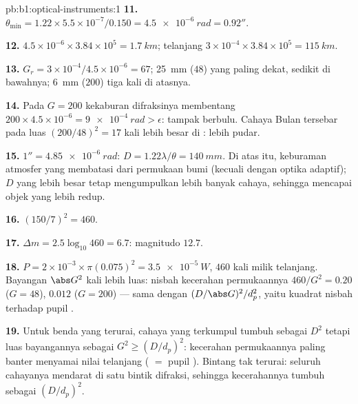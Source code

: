 \begin{solution}{pb:b1:optical-instruments:1}
\textbf{11.} $\theta_{\min} = 1.22 \times 5.5\times10^{-7}/0.150 =
\qty{4.5e-6}{rad} = 0.92''$.

\textbf{12.} $4.5\times10^{-6} \times 3.84\times10^5 = \qty{1.7}{km}$;
 telanjang $3\times10^{-4} \times 3.84\times10^5 = \qty{115}{km}$.

\textbf{13.} $G_r = 3\times10^{-4}/4.5\times10^{-6} = 67$;  \qty{25}{mm}
($48$) yang paling dekat, sedikit di bawahnya;  \qty{6}{mm} ($200$)
tiga kali di atasnya.

\textbf{14.} Pada $G = 200$ kekaburan difraksinya membentang $200 \times 4.5
\times10^{-6} = \qty{9e-4}{rad} > \epsilon$: tampak berbulu. Cahaya
Bulan tersebar pada luas $(200/48)^2 = 17$ kali lebih besar di
: lebih pudar.

\textbf{15.} $1'' = \qty{4.85e-6}{rad}$: $D = 1.22\lambda/\theta =
\qty{140}{mm}$. Di atas itu, keburaman atmosfer yang membatasi  dari permukaan bumi (kecuali dengan optika adaptif); $D$ yang lebih
besar tetap mengumpulkan lebih banyak cahaya, sehingga mencapai objek
yang lebih redup.

\textbf{16.} $(150/7)^2 = 460$.

\textbf{17.} $\Delta m = 2.5\log_{10}460 = 6.7$: magnitudo $12.7$.

\textbf{18.} $P = 2\times10^{-3} \times \pi(0.075)^2 = \qty{3.5e-5}{W}$,
$460$ kali milik  telanjang. Bayangan  $\abs G^2$ kali
lebih luas: nisbah kecerahan permukaannya $460/G^2 = 0.20$ ($G = 48$),
$0.012$ ($G = 200$) --- sama dengan $(D/\abs G)^2/d_p^2$, yaitu kuadrat
nisbah  terhadap pupil .

\textbf{19.} Untuk benda yang terurai, cahaya yang terkumpul tumbuh
sebagai $D^2$ tetapi luas bayangannya sebagai $G^2 \geq (D/d_p)^2$:
kecerahan permukaannya paling banter menyamai nilai  telanjang
( $=$ pupil ). Bintang tak terurai: seluruh cahayanya
mendarat di satu bintik difraksi, sehingga kecerahannya tumbuh sebagai $(D/d_p)^2$.


\end{solution}
